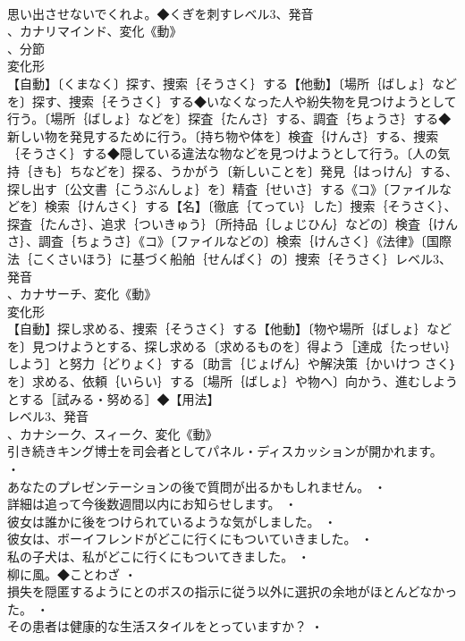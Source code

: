 \documentclass[8pt]{extreport}
\begin{document}
\begin{CJK}{UTF8}{min}
\\	思い出させないでくれよ。◆くぎを刺すレベル3、発音
\\	、カナリマインド、変化《動》
\\	、分節
\\	変化形 
\\	【自動】〔くまなく〕探す、捜索｛そうさく｝する【他動】〔場所｛ばしょ｝などを〕探す、捜索｛そうさく｝する◆いなくなった人や紛失物を見つけようとして行う。〔場所｛ばしょ｝などを〕探査｛たんさ｝する、調査｛ちょうさ｝する◆新しい物を発見するために行う。〔持ち物や体を〕検査｛けんさ｝する、捜索｛そうさく｝する◆隠している違法な物などを見つけようとして行う。〔人の気持｛きも｝ちなどを〕探る、うかがう〔新しいことを〕発見｛はっけん｝する、探し出す〔公文書｛こうぶんしょ｝を〕精査｛せいさ｝する《コ》〔ファイルなどを〕検索｛けんさく｝する【名】〔徹底｛てってい｝した〕捜索｛そうさく｝、探査｛たんさ｝、追求｛ついきゅう｝〔所持品｛しょじひん｝などの〕検査｛けんさ｝、調査｛ちょうさ｝《コ》〔ファイルなどの〕検索｛けんさく｝《法律》〔国際法｛こくさいほう｝に基づく船舶｛せんぱく｝の〕捜索｛そうさく｝レベル3、発音
\\	、カナサーチ、変化《動》
\\	変化形 
\\	【自動】探し求める、捜索｛そうさく｝する【他動】〔物や場所｛ばしょ｝などを〕見つけようとする、探し求める〔求めるものを〕得よう［達成｛たっせい｝しよう］と努力｛どりょく｝する〔助言｛じょげん｝や解決策｛かいけつ さく｝を〕求める、依頼｛いらい｝する〔場所｛ばしょ｝や物へ〕向かう、進むしようとする［試みる・努める］◆【用法】
\\	レベル3、発音
\\	、カナシーク、スィーク、変化《動》
\\	引き続きキング博士を司会者としてパネル・ディスカッションが開かれます。 ・
\\	あなたのプレゼンテーションの後で質問が出るかもしれません。 ・
\\	詳細は追って今後数週間以内にお知らせします。 ・
\\	彼女は誰かに後をつけられているような気がしました。 ・
\\	彼女は、ボーイフレンドがどこに行くにもついていきました。 ・
\\	私の子犬は、私がどこに行くにもついてきました。 ・
\\	柳に風。◆ことわざ ・
\\	損失を隠匿するようにとのボスの指示に従う以外に選択の余地がほとんどなかった。 ・
\\	その患者は健康的な生活スタイルをとっていますか？ ・

\end{CJK}
\end{document}

